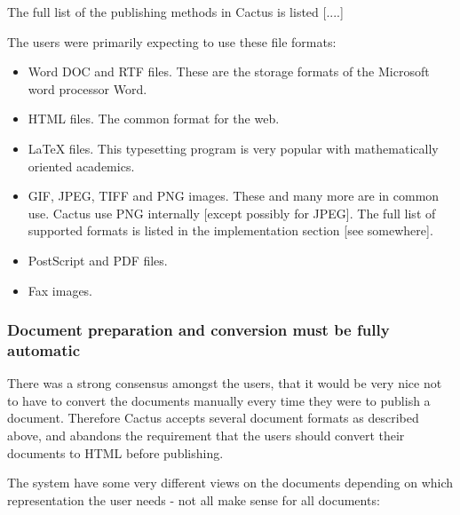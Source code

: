 The full list of the publishing methods in Cactus is listed [....]

The users were primarily expecting to use these file formats:

\begin{itemize}
  
\item 
  Word DOC and RTF files.   These are the storage formats of the
  Microsoft word processor Word.  
\item 
  HTML files.  The common format for the web.
\item 
  LaTeX files.   This typesetting program is very popular with
  mathematically oriented academics.
\item 
  GIF, JPEG, TIFF and PNG images.   These and many more are in common use.  Cactus use PNG internally [except possibly for JPEG].  The full list of supported
formats is listed in the implementation section [see somewhere].
\item 
  PostScript and PDF files.
\item 
  Fax images.
\end{itemize}

\subsubsection{Document preparation and conversion must be fully automatic}

There was a strong consensus amongst the users, that it would be very
nice not to have to convert the documents manually every time they
were to publish a document.  Therefore Cactus accepts several document
formats as described above, and abandons the requirement that the
users should convert their documents to HTML before publishing.

The system have some very different views on the documents depending
on which representation the user needs - not all make sense for all
documents:

